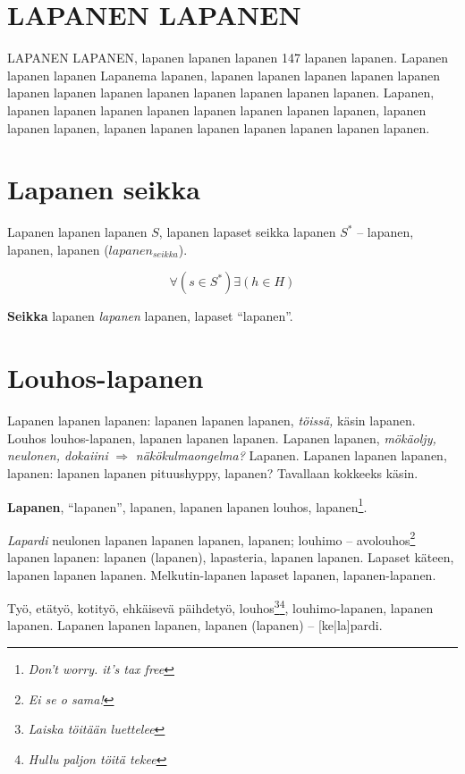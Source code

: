 \documentclass[a4paper]{article}
\begin{document}
\begin{multicols}{2}
\section{LAPANEN LAPANEN}

LAPANEN LAPANEN, lapanen lapanen lapanen 147 lapanen lapanen. Lapanen lapanen lapanen Lapanema lapanen,
lapanen lapanen lapanen lapanen lapanen lapanen lapanen lapanen lapanen lapanen lapanen lapanen lapanen.
Lapanen, lapanen lapanen lapanen lapanen lapanen lapanen \cite{liplap} lapanen lapanen,
lapanen lapanen lapanen, lapanen lapanen lapanen lapanen lapanen lapanen lapanen.


\section{Lapanen seikka}

Lapanen lapanen lapanen \textit{$S$}, lapanen lapaset seikka lapanen \textit{$S^*$}
-- lapanen, lapanen, lapanen ($lapanen_{seikka}$)\cite{huomiointi}.

\begin{equation}
\forall(s \in S^*)\exists(h \in H)
\end{equation}

\textbf{Seikka} lapanen \textit{lapanen} lapanen, lapaset ``lapanen''.


\section{Louhos-lapanen}

Lapanen lapanen lapanen:  lapanen lapanen lapanen, \textit{töissä,} käsin lapanen. Louhos louhos-lapanen, lapanen
lapanen lapanen. Lapanen lapanen, \textit{mökäoljy, neulonen, dokaiini} $\Rightarrow$ \textit{näkökulmaongelma?} Lapanen.
Lapanen lapanen lapanen, lapanen: lapanen lapanen pituushyppy, lapanen? Tavallaan kokkeeks käsin.

\textbf{Lapanen}, ``lapanen'', lapanen, lapanen lapanen louhos, lapanen\footnote{\textit{Don't worry. it's tax free}}.

\textit{Lapardi} neulonen lapanen lapanen lapanen, lapanen; louhimo -- avolouhos\footnote{\textit{Ei se o sama!}}
lapanen lapanen: lapanen (lapanen), lapasteria, lapanen lapanen. Lapaset käteen, lapanen lapanen lapanen. Melkutin-lapanen
lapaset lapanen, lapanen-lapanen.

Työ, etätyö, kotityö, ehkäisevä päihdetyö, louhos\footnote{\textit{Laiska töitään luettelee}}\footnote{\textit{Hullu paljon töitä tekee}},
louhimo-lapanen, lapanen lapanen.
Lapanen lapanen lapanen, lapanen (lapanen) -- [ke|la]pardi.


\end{multicols}
\end{document}
